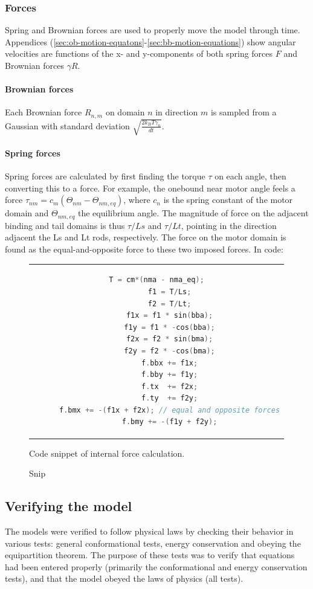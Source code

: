 \documentclass[10pt]{article} %
\begin{document}
\subsubsection{Forces}
Spring and Brownian forces are used to properly move the model through time. Appendices (\ref{sec:ob-motion-equatons}-\ref{sec:bb-motion-equations}) show angular velocities are functions of the x- and y-components of both spring forces $F$ and Brownian forces $\gamma R$.

\paragraph{Brownian forces}
Each Brownian force $R_{n,m}$ on domain $n$ in direction $m$ is sampled from a Gaussian with standard deviation $\sqrt{\frac{2k_BT\gamma_n}{dt}}$.\\

\paragraph{Spring forces}
Spring forces are calculated by first finding the torque $\tau$ on each angle, then converting this to a force. For example, the onebound near motor angle feels a force $\tau_{nm} = c_m(\Theta_{nm}-\Theta_{nm,eq})$, where $c_n$ is the spring constant of the motor domain and $\Theta_{nm,eq}$ the equilibrium angle. The magnitude of force on the adjacent binding and tail domains is thus $\tau/Ls$ and $\tau/Lt$, pointing in the direction adjacent the Ls and Lt rods, respectively. The force on the motor domain is found as the equal-and-opposite force to these two imposed forces. In code:

\begin{figure}[h]
  \centering
  \begin{tabular}{c}
    \begin{lstlisting}[language=C++]
      T = cm*(nma - nma_eq);
      f1 = T/Ls;
      f2 = T/Lt;
      f1x = f1 * sin(bba);
      f1y = f1 * -cos(bba);
      f2x = f2 * sin(bma);
      f2y = f2 * -cos(bma);
      f.bbx += f1x;
      f.bby += f1y;
      f.tx  += f2x;
      f.ty  += f2y;
      f.bmx += -(f1x + f2x); // equal and opposite forces
      f.bmy += -(f1y + f2y);
    \end{lstlisting}
  \end{tabular}
  \caption{Snip}{Code snippet of internal force calculation.}
  \label{transition-rate-snippet}
\end{figure}

\subsection{Verifying the model}
The models were verified to follow physical laws by checking their behavior in various tests: general conformational tests, energy conservation and obeying the equipartition theorem. The purpose of these tests was to verify that equations had been entered properly (primarily the conformational and energy conservation tests), and that the model obeyed the laws of physics (all tests).
\end{document}
